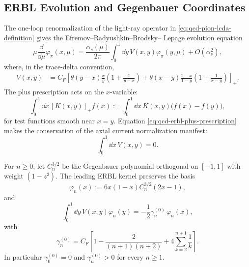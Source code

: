 \subsection{ERBL Evolution and Gegenbauer Coordinates}
\label{subsec:qcd-erbl-gegenbauer-coordinates}

The one-loop renormalization of the light-ray operator in
\eqref{eq:qcd-pion-lcda-definition} gives the Efremov--Radyushkin--Brodsky--
Lepage evolution equation
\begin{equation}
  \mu\frac{\dd}{\dd\mu}\varphi_\pi(x,\mu)
  =
  \frac{\alpha_s(\mu)}{2\pi}
  \int_0^1\dd y\,V(x,y)\varphi_\pi(y,\mu)
  +O(\alpha_s^2),
  \label{eq:qcd-erbl-evolution}
\end{equation}
where, in the trace-delta convention,
\begin{align}
  V(x,y)
  &=
  C_F
  \left[
  \theta(y-x)\frac{x}{y}
  \left(1+\frac1{y-x}\right)
  +
  \theta(x-y)\frac{1-x}{1-y}
  \left(1+\frac1{x-y}\right)
  \right]_+ .
  \label{eq:qcd-erbl-kernel}
\end{align}
The plus prescription acts on the \(x\)-variable:
\begin{equation}
  \int_0^1\dd x\,[K(x,y)]_+ f(x)
  :=
  \int_0^1\dd x\,K(x,y)\bigl(f(x)-f(y)\bigr),
  \label{eq:qcd-erbl-plus-prescription}
\end{equation}
for test functions smooth near \(x=y\).  Equation
\eqref{eq:qcd-erbl-plus-prescription} makes the conservation of the axial
current normalization manifest:
\[
  \int_0^1\dd x\,V(x,y)=0 .
\]

\begin{proposition}
\label{prop:qcd-erbl-gegenbauer-diagonalization}
For \(n\ge0\), let \(C_n^{3/2}\) be the Gegenbauer polynomial orthogonal on
\([-1,1]\) with weight \((1-z^2)\).  The leading ERBL kernel preserves the
basis
\[
  \varphi_n(x):=6x(1-x)C_n^{3/2}(2x-1),
\]
and
\begin{equation}
  \int_0^1\dd y\,V(x,y)\varphi_n(y)
  =
  -\frac12\gamma_n^{(0)}\,\varphi_n(x),
  \label{eq:qcd-erbl-eigenvalue-equation}
\end{equation}
with
\begin{equation}
  \gamma_n^{(0)}
  =
  C_F\left[
  1-\frac{2}{(n+1)(n+2)}
  +4\sum_{k=2}^{n+1}\frac1k
  \right].
  \label{eq:qcd-erbl-anomalous-dimensions}
\end{equation}
In particular \(\gamma_0^{(0)}=0\) and
\(\gamma_n^{(0)}>0\) for every \(n\ge1\).
\end{proposition}


